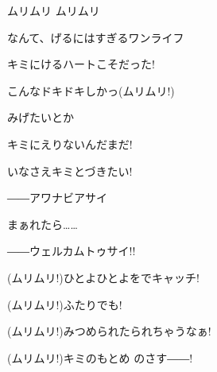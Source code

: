 \documentclass[a4paper,tate,twocolumn,12pt]{ltjtarticle}
\begin{document}
\begin{flushleft}
\vspace{2em}

\noindent\begin{minipage}{\linewidth}
ムリムリ ムリムリ

なんて、げるにはすぎるワンライフ

キミにけるハートこそだった!

こんなドキドキしかっ(ムリムリ!)
\end{minipage}

\vspace{2em}

\noindent\begin{minipage}{\linewidth}
 みげたいとか

キミにえりないんだまだ!

いなさえキミとづきたい!

――アワナビアサイ

まぁれたら……

――ウェルカムトゥサイ!!
\end{minipage}

\vspace{2em}

\noindent\begin{minipage}{\linewidth}
(ムリムリ!)ひとよひとよをでキャッチ!

(ムリムリ!)ふたりでも!

(ムリムリ!)みつめられたられちゃうなぁ!

(ムリムリ!)キミのもとめ のさす――!
\end{minipage}

\end{flushleft}
\end{document}
